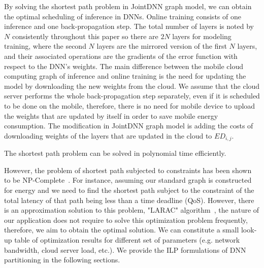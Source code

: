 By solving the shortest path problem in JointDNN graph model, we can obtain the optimal scheduling of inference in DNNs. Online training consists of one inference and one back-propagation step. The total number of layers is noted by $N$ consistently throughout this paper so there are $2N$ layers for modeling training, where the second $N$ layers are the mirrored version of the first $N$ layers, and their associated operations are the gradients of the error function with respect to the DNN's weights. The main difference between the mobile cloud computing graph of inference and online training is the need for updating the model by downloading the new weights from the cloud. We assume that the cloud server performs the whole back-propagation step separately, even if it is scheduled to be done on the mobile, therefore, there is no need for mobile device to upload the weights that are updated by itself in order to save mobile energy consumption. The modification in JointDNN graph model is adding the costs of downloading weights of the layers that are updated in the cloud to $ED_{i,j}$.

The shortest path problem can be solved in polynomial time efficiently. 

However, the problem of shortest path subjected to constraints has been shown to be NP-Complete~\cite{NPComplete}. For instance, assuming our standard graph is constructed for energy and we need to find the shortest path subject to the constraint of the total latency of that path being less than a time deadline (QoS). However, there is an approximation solution to this problem, "LARAC" algorithm~\cite{LARAC}, the nature of our application does not require to solve this optimization problem frequently, therefore, we aim to obtain the optimal solution. We can constitute a small look-up table of optimization results for different set of parameters (e.g. network bandwidth, cloud server load, etc.). We provide the ILP formulations of DNN partitioning in the following sections.

